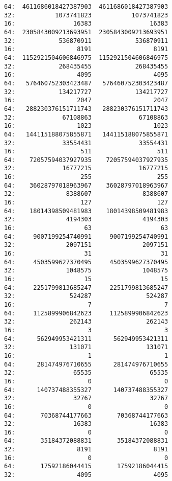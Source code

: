 \documentclass[11pt]{article}
\begin{document}
\begin{verbatim}
64:  4611686018427387903  4611686018427387903
32:           1073741823           1073741823
16:                16383                16383
64:  2305843009213693951  2305843009213693951
32:            536870911            536870911
16:                 8191                 8191
64:  1152921504606846975  1152921504606846975
32:            268435455            268435455
16:                 4095                 4095
64:   576460752303423487   576460752303423487
32:            134217727            134217727
16:                 2047                 2047
64:   288230376151711743   288230376151711743
32:             67108863             67108863
16:                 1023                 1023
64:   144115188075855871   144115188075855871
32:             33554431             33554431
16:                  511                  511
64:    72057594037927935    72057594037927935
32:             16777215             16777215
16:                  255                  255
64:    36028797018963967    36028797018963967
32:              8388607              8388607
16:                  127                  127
64:    18014398509481983    18014398509481983
32:              4194303              4194303
16:                   63                   63
64:     9007199254740991     9007199254740991
32:              2097151              2097151
16:                   31                   31
64:     4503599627370495     4503599627370495
32:              1048575              1048575
16:                   15                   15
64:     2251799813685247     2251799813685247
32:               524287               524287
16:                    7                    7
64:     1125899906842623     1125899906842623
32:               262143               262143
16:                    3                    3
64:      562949953421311      562949953421311
32:               131071               131071
16:                    1                    1
64:      281474976710655      281474976710655
32:                65535                65535
16:                    0                    0
64:      140737488355327      140737488355327
32:                32767                32767
16:                    0                    0
64:       70368744177663       70368744177663
32:                16383                16383
16:                    0                    0
64:       35184372088831       35184372088831
32:                 8191                 8191
16:                    0                    0
64:       17592186044415       17592186044415
32:                 4095                 4095

\end{verbatim}
\end{document}
